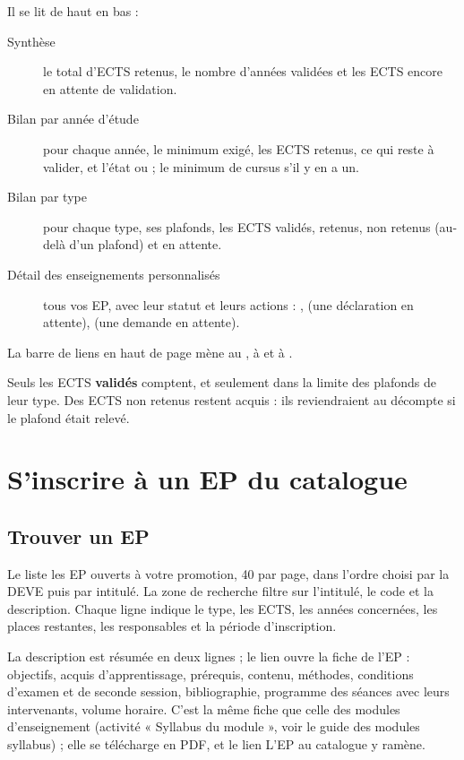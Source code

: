 \documentclass[11pt,a4paper]{article}
\begin{document}
Il se lit de haut en bas :
\begin{description}
  \item[Synthèse] le total d'ECTS retenus, le nombre d'années validées et les ECTS encore en
    attente de validation.
  \item[Bilan par année d'étude] pour chaque année, le minimum exigé, les ECTS retenus, ce qui
    reste à valider, et l'état  ou  ; le minimum de
    cursus s'il y en a un.
  \item[Bilan par type] pour chaque type, ses plafonds, les ECTS validés, retenus, non retenus
    (au-delà d'un plafond) et en attente.
  \item[Détail des enseignements personnalisés] tous vos EP, avec leur statut et leurs
    actions : ,  (une déclaration en attente),
     (une demande en attente).
\end{description}

La barre de liens en haut de page mène au , à  et à .

\begin{astuce}
Seuls les ECTS \textbf{validés} comptent, et seulement dans la limite des plafonds de leur
type. Des ECTS non retenus restent acquis : ils reviendraient au décompte si le plafond était
relevé.
\end{astuce}

\section{S'inscrire à un EP du catalogue}\label{sec:inscription}

\subsection{Trouver un EP}

Le  liste les EP ouverts à votre promotion, 40 par page, dans l'ordre
choisi par la DEVE puis par intitulé. La zone de recherche filtre sur l'intitulé, le code et la
description. Chaque ligne indique le type,
les ECTS, les années concernées, les places restantes, les responsables et la période
d'inscription.


La description est résumée en deux lignes ; le lien  ouvre la fiche de l'EP :
objectifs, acquis d'apprentissage, prérequis, contenu, méthodes, conditions d'examen et de
seconde session, bibliographie, programme des séances avec leurs intervenants, volume horaire.
C'est la même fiche que celle des modules d'enseignement (activité « Syllabus du module »,
voir le guide des modules syllabus) ; elle se télécharge en PDF, et le lien \og L'EP au
catalogue\fg{} y ramène.
\end{document}
